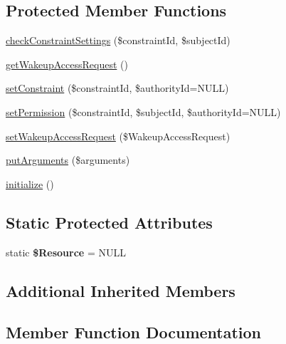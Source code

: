 \subsection*{Protected Member Functions}
\begin{DoxyCompactItemize}
\item 
\hyperlink{class_able_polecat___resource___restricted_abstract_a06a5f893b4440639301618a91c8d5009}{check\+Constraint\+Settings} (\$constraint\+Id, \$subject\+Id)
\item 
\hyperlink{class_able_polecat___resource___restricted_abstract_a7a7a5c16b7f7ba9b0a2660cd14dec01a}{get\+Wakeup\+Access\+Request} ()
\item 
\hyperlink{class_able_polecat___resource___restricted_abstract_ae323b90c762ce6cde341e8b9937bf7f6}{set\+Constraint} (\$constraint\+Id, \$authority\+Id=N\+U\+L\+L)
\item 
\hyperlink{class_able_polecat___resource___restricted_abstract_a1653bc370f5ccc724c65b72c94882b79}{set\+Permission} (\$constraint\+Id, \$subject\+Id, \$authority\+Id=N\+U\+L\+L)
\item 
\hyperlink{class_able_polecat___resource___restricted_abstract_a02f0a65ed7e607c39ff550ca15a28279}{set\+Wakeup\+Access\+Request} (\$Wakeup\+Access\+Request)
\item 
\hyperlink{class_able_polecat___resource___restricted_abstract_a1ad601dd41b953bfa07c99f6b17d482d}{put\+Arguments} (\$arguments)
\item 
\hyperlink{class_able_polecat___resource___restricted_abstract_a91098fa7d1917ce4833f284bbef12627}{initialize} ()
\end{DoxyCompactItemize}
\subsection*{Static Protected Attributes}
\begin{DoxyCompactItemize}
\item 
\hypertarget{class_able_polecat___resource___restricted_abstract_afaf708052f29a25498aaf37ceb8aba6f}{}static {\bfseries \$\+Resource} = N\+U\+L\+L\label{class_able_polecat___resource___restricted_abstract_afaf708052f29a25498aaf37ceb8aba6f}

\end{DoxyCompactItemize}
\subsection*{Additional Inherited Members}


\subsection{Member Function Documentation}
\hypertarget{class_able_polecat___resource___restricted_abstract_a06a5f893b4440639301618a91c8d5009}{}
